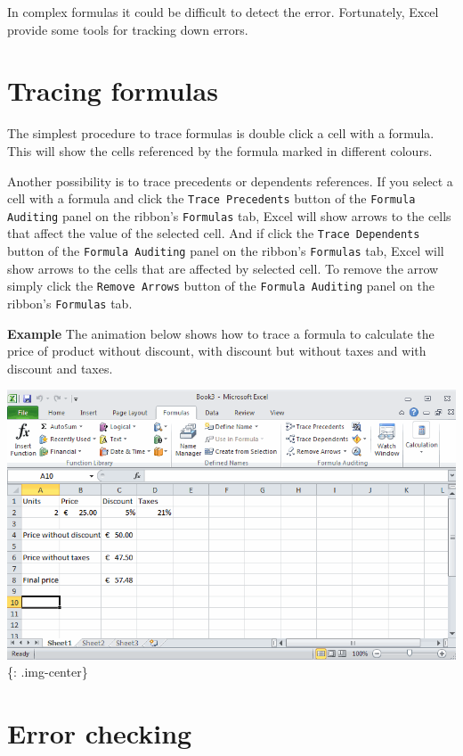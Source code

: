 In complex formulas it could be difficult to detect the error. Fortunately, Excel provide some tools for tracking down errors. 

\section{Tracing formulas}
\label{tracingformulas}

The simplest procedure to trace formulas is double click a cell with a formula. This will show the cells referenced by the formula marked in different colours. 

Another possibility is to trace precedents or dependents references. If you select a cell with a formula and click the \texttt{Trace Precedents} button of the \texttt{Formula Auditing} panel on the ribbon's \texttt{Formulas} tab, Excel will show arrows to the cells that affect the value of the selected cell. And if click the \texttt{Trace Dependents} button of the \texttt{Formula Auditing} panel on the ribbon's \texttt{Formulas} tab, Excel will show arrows to the cells that are affected by selected cell. To remove the arrow simply click the \texttt{Remove Arrows} button of the \texttt{Formula Auditing} panel on the ribbon's \texttt{Formulas} tab.

\textbf{Example} The animation below shows how to trace a formula to calculate the price of product without discount, with discount but without taxes and with discount and taxes.

\includegraphics[keepaspectratio,width=\textwidth,height=0.75\textheight]{img/example_formula_trace.gif}
\{: .img-center\}

\section{Error checking}
\label{errorchecking}

